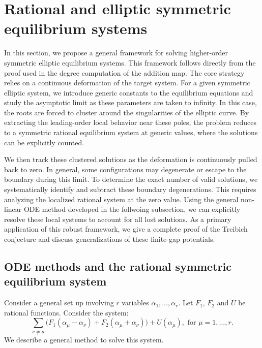 \documentclass[11pt]{amsart}
\theoremstyle{remark}
\numberwithin{equation}{section}
\begin{document}
\section{Rational and elliptic symmetric equilibrium systems}
In this section, we propose a general framework for solving higher-order symmetric elliptic equilibrium systems. This framework follows directly from the proof used in the degree computation of the addition map. The core strategy relies on a continuous deformation of the target system. For a given symmetric elliptic system, we introduce generic constants to the equilibrium equations and study the asymptotic limit as these parameters are taken to infinity. In this case, the roots are forced to cluster around the singularities of the elliptic curve. By extracting the leading-order local behavior near these poles, the problem reduces to a symmetric rational equilibrium system at generic values, where the solutions can be explicitly counted. 

We then track these clustered solutions as the deformation is continuously pulled back to zero. In general, some configurations may degenerate or escape to the boundary during this limit. To determine the exact number of valid solutions, we systematically identify and subtract these boundary degenerations. This requires analyzing the localized rational system at the zero value. Using the general non-linear ODE method developed in the follwoing subsection, we can explicitly resolve these local systems to account for all lost solutions. As a primary application of this robust framework, we give a complete proof of the Treibich conjecture and discuss generalizations of these finite-gap potentials.
\subsection{ODE methods and the rational symmetric equilibrium system}
Consider a general set up involving $r$ variables $\alpha_1, \dots, \alpha_r$. Let $F_1$, $F_2$ and $U$ be rational functions. Consider the system:
\begin{equation} \label{eqn:rational_equilibrium}
    \sum_{\nu \neq \mu } \Big( F_1(\alpha_\mu - \alpha_\nu) + F_2(\alpha_\mu + \alpha_\nu) \Big) + U(\alpha_\mu), \text{ for }\mu=1,\dots,r.
\end{equation}
We describe a general method to solve this system. 
\end{document}
